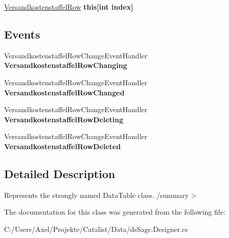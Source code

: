 \begin{DoxyCompactItemize}
\item 
\hyperlink{class_products_1_1_data_1_1ds_sage_1_1_versandkostenstaffel_row}{Versandkostenstaffel\+Row} {\bfseries this\mbox{[}int index\mbox{]}}\hypertarget{class_products_1_1_data_1_1ds_sage_1_1_versandkostenstaffel_data_table_a1b17a2ec581f8e3fa8d971d4aa5d23b1}{}\label{class_products_1_1_data_1_1ds_sage_1_1_versandkostenstaffel_data_table_a1b17a2ec581f8e3fa8d971d4aa5d23b1}

\end{DoxyCompactItemize}
\subsection*{Events}
\begin{DoxyCompactItemize}
\item 
Versandkostenstaffel\+Row\+Change\+Event\+Handler {\bfseries Versandkostenstaffel\+Row\+Changing}\hypertarget{class_products_1_1_data_1_1ds_sage_1_1_versandkostenstaffel_data_table_ad63cf45fb3bc7af135bf187e9ec05b9a}{}\label{class_products_1_1_data_1_1ds_sage_1_1_versandkostenstaffel_data_table_ad63cf45fb3bc7af135bf187e9ec05b9a}

\item 
Versandkostenstaffel\+Row\+Change\+Event\+Handler {\bfseries Versandkostenstaffel\+Row\+Changed}\hypertarget{class_products_1_1_data_1_1ds_sage_1_1_versandkostenstaffel_data_table_a7b10d961cf4d01f1f598f81e152366ca}{}\label{class_products_1_1_data_1_1ds_sage_1_1_versandkostenstaffel_data_table_a7b10d961cf4d01f1f598f81e152366ca}

\item 
Versandkostenstaffel\+Row\+Change\+Event\+Handler {\bfseries Versandkostenstaffel\+Row\+Deleting}\hypertarget{class_products_1_1_data_1_1ds_sage_1_1_versandkostenstaffel_data_table_a71c7f4fc5407d4154c9d0ba3e5eb34b4}{}\label{class_products_1_1_data_1_1ds_sage_1_1_versandkostenstaffel_data_table_a71c7f4fc5407d4154c9d0ba3e5eb34b4}

\item 
Versandkostenstaffel\+Row\+Change\+Event\+Handler {\bfseries Versandkostenstaffel\+Row\+Deleted}\hypertarget{class_products_1_1_data_1_1ds_sage_1_1_versandkostenstaffel_data_table_a91f4bf0949bdffc351d5c6d9f2b22313}{}\label{class_products_1_1_data_1_1ds_sage_1_1_versandkostenstaffel_data_table_a91f4bf0949bdffc351d5c6d9f2b22313}

\end{DoxyCompactItemize}


\subsection{Detailed Description}
Represents the strongly named Data\+Table class. /summary$>$ 

The documentation for this class was generated from the following file\+:\begin{DoxyCompactItemize}
\item 
C\+:/\+Users/\+Axel/\+Projekte/\+Catalist/\+Data/ds\+Sage.\+Designer.\+cs\end{DoxyCompactItemize}
